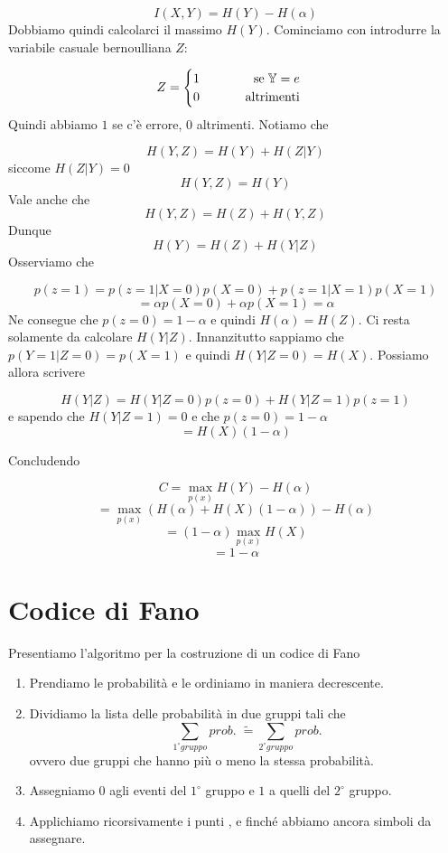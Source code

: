 \documentclass[12pt]{report}
\begin{document}
    $$I(X,Y) = H(Y) - H(\alpha)$$
    Dobbiamo quindi calcolarci il massimo $H(Y)$. Cominciamo con introdurre la variabile casuale bernoulliana $Z$:

    $$ Z = \begin{cases}
               1 \hspace{40px} \;\text{se}\; \mathbb{Y} = e\\
               0 \hfill \text{altrimenti}
    \end{cases}$$
    Quindi abbiamo $1$ se c'è errore, $0$ altrimenti. Notiamo che

    $$H(Y,Z) = H(Y) + H(Z|Y) $$
    siccome $H(Z|Y) = 0$
    $$H(Y,Z) = H(Y)$$
    Vale anche che
    $$H(Y,Z) = H(Z) + H(Y,Z)$$
    Dunque
    $$H(Y) = H(Z) + H(Y|Z)$$
    Osserviamo che

    $$p(z = 1) = p(z=1 | X = 0) p(X = 0) + p(z=1 | X = 1) p(X = 1)$$
    $$= \alpha p(X = 0) + \alpha p(X = 1) = \alpha$$
    Ne consegue che $p(z = 0) = 1 -\alpha$ e quindi $H(\alpha) = H(Z)$. Ci resta solamente da calcolare $H(Y|Z)$. Innanzitutto sappiamo che $p(Y = 1 | Z = 0) = p(X = 1)$ e quindi $H(Y | Z = 0) = H(X)$. Possiamo allora scrivere

    $$H(Y|Z) = H(Y|Z = 0) p(z = 0) + H(Y|Z = 1) p(z = 1)$$
    e sapendo che $H(Y|Z = 1) = 0$ e che $p(z = 0) = 1 - \alpha$
    $$= H(X) (1 - \alpha)$$

    \noindent
    Concludendo

    $$C = \max_{p(x)} H(Y) - H(\alpha) $$
    $$= \max_{p(x)} (H(\alpha) + H(X) (1 - \alpha)) - H(\alpha)$$
    $$= (1-\alpha) \max_{p(x)} H(X)$$
    $$= 1 - \alpha$$

    \section{Codice di Fano}
    Presentiamo l'algoritmo per la costruzione di un codice di Fano

    \begin{enumerate}
        \item Prendiamo le probabilità e le ordiniamo in maniera decrescente.
        \item Dividiamo la lista delle probabilità in due gruppi tali che $$\sum_{1^\circ gruppo} prob.\; \tilde =  \sum_{2^\circ gruppo} prob.$$
        ovvero due gruppi che hanno più o meno la stessa probabilità.
        \item Assegniamo $0$ agli eventi del $1^\circ$ gruppo e $1$ a quelli del $2^\circ$ gruppo.
        \item Applichiamo ricorsivamente i punti , e  finché abbiamo ancora simboli da assegnare.
    \end{enumerate}
\end{document}
